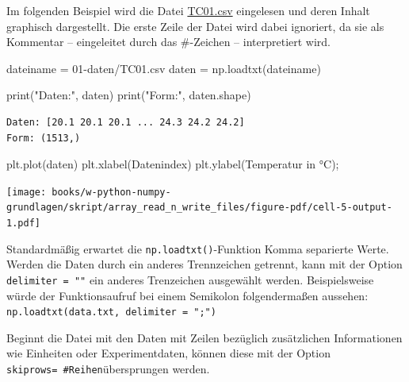 \documentclass[
  letterpaper,
  DIV=11,
  numbers=noendperiod]{scrreprt}
\newenvironment{Shaded}{\begin{snugshade}}{\end{snugshade}}
\newcommand{\BuiltInTok}[1]{\textcolor[rgb]{0.00,0.23,0.31}{#1}}
\newcommand{\NormalTok}[1]{\textcolor[rgb]{0.00,0.23,0.31}{#1}}
\newcommand{\OperatorTok}[1]{\textcolor[rgb]{0.37,0.37,0.37}{#1}}
\newcommand{\StringTok}[1]{\textcolor[rgb]{0.13,0.47,0.30}{#1}}
\begin{document}
Im folgenden Beispiel wird die Datei
\href{https://firedynamics.github.io/LectureComputerScience/_downloads/0d1a3bfbc82fa134e08585d6151e9f46/TC01.csv}{TC01.csv}
eingelesen und deren Inhalt graphisch dargestellt. Die erste Zeile der
Datei wird dabei ignoriert, da sie als Kommentar -- eingeleitet durch
das \#-Zeichen -- interpretiert wird.

\begin{Shaded}
\begin{Highlighting}[]
\NormalTok{dateiname }\OperatorTok{=} \StringTok{\textquotesingle{}01{-}daten/TC01.csv\textquotesingle{}}
\NormalTok{daten }\OperatorTok{=}\NormalTok{ np.loadtxt(dateiname)}
\end{Highlighting}
\end{Shaded}

\begin{Shaded}
\begin{Highlighting}[]
\BuiltInTok{print}\NormalTok{(}\StringTok{"Daten:"}\NormalTok{, daten)}
\BuiltInTok{print}\NormalTok{(}\StringTok{"Form:"}\NormalTok{, daten.shape)}
\end{Highlighting}
\end{Shaded}

\begin{verbatim}
Daten: [20.1 20.1 20.1 ... 24.3 24.2 24.2]
Form: (1513,)
\end{verbatim}

\begin{Shaded}
\begin{Highlighting}[]
\NormalTok{plt.plot(daten)}
\NormalTok{plt.xlabel(}\StringTok{\textquotesingle{}Datenindex\textquotesingle{}}\NormalTok{)}
\NormalTok{plt.ylabel(}\StringTok{\textquotesingle{}Temperatur in °C\textquotesingle{}}\NormalTok{)}\OperatorTok{;}
\end{Highlighting}
\end{Shaded}

\texttt{[image: books/w-python-numpy-grundlagen/skript/array\_read\_n\_write\_files/figure-pdf/cell-5-output-1.pdf]}

Standardmäßig erwartet die \texttt{np.loadtxt()}-Funktion Komma
separierte Werte. Werden die Daten durch ein anderes Trennzeichen
getrennt, kann mit der Option \texttt{delimiter\ =\ ""} ein anderes
Trenzeichen ausgewählt werden. Beispielsweise würde der Funktionsaufruf
bei einem Semikolon folgendermaßen aussehen:
\texttt{np.loadtxt(data.txt,\ delimiter\ =\ ";")}

Beginnt die Datei mit den Daten mit Zeilen bezüglich zusätzlichen
Informationen wie Einheiten oder Experimentdaten, können diese mit der
Option \texttt{skiprows=\ \#Reihen}übersprungen werden.
\end{document}
